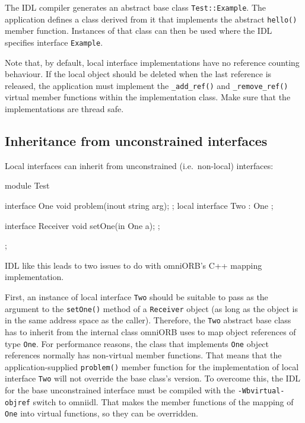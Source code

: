 \documentclass[11pt,twoside,a4paper]{book}
\newcommand{\type}[1]{\texttt{#1}}
\newcommand{\op}[1]{\texttt{#1()}}
\newcommand{\cmdline}[1]{\texttt{#1}}
\begin{document}
The IDL compiler generates an abstract base class
\type{Test::Example}. The application defines a class derived from it
that implements the abstract \op{hello} member function. Instances of
that class can then be used where the IDL specifies interface
\type{Example}.

Note that, by default, local interface implementations have no
reference counting behaviour. If the local object should be deleted
when the last reference is released, the application must implement
the \op{\_add\_ref} and \op{\_remove\_ref} virtual member functions
within the implementation class. Make sure that the implementations
are thread safe.


\subsection{Inheritance from unconstrained interfaces}

Local interfaces can inherit from unconstrained (i.e.\ non-local)
interfaces:

\begin{idllisting}
module Test {
  interface One {
    void problem(inout string arg);
  };
  local interface Two : One {
  };

  interface Receiver {
    void setOne(in One a);
  };
};
\end{idllisting}

IDL like this leads to two issues to do with omniORB's C++ mapping
implementation.

First, an instance of local interface \type{Two} should be suitable to
pass as the argument to the \op{setOne} method of a \type{Receiver}
object (as long as the object is in the same address space as the
caller). Therefore, the \type{Two} abstract base class has to inherit
from the internal class omniORB uses to map object references of type
\type{One}. For performance reasons, the class that implements
\type{One} object references normally has non-virtual member
functions. That means that the application-supplied \op{problem}
member function for the implementation of local interface \type{Two}
will not override the base class's version. To overcome this, the IDL
for the base unconstrained interface must be compiled with the
\cmdline{-Wbvirtual-objref} switch to omniidl. That makes the member
functions of the mapping of \type{One} into virtual functions, so they
can be overridden.
\end{document}

